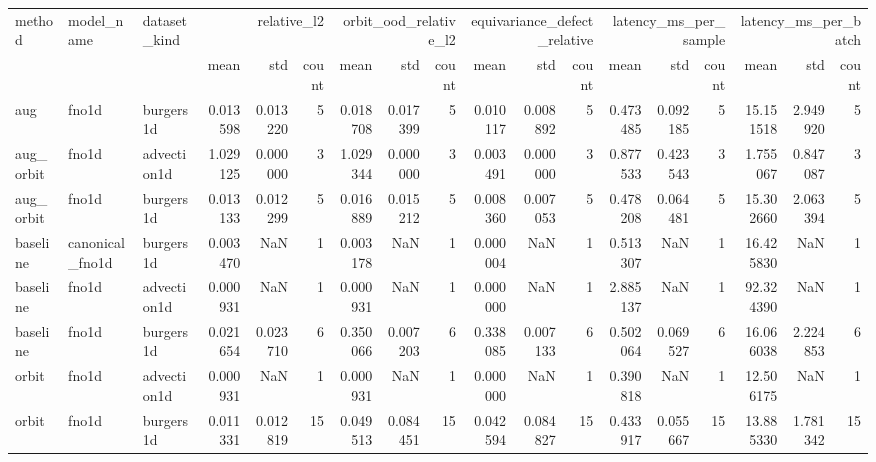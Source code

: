 \begin{tabular}{lllrrrrrrrrrrrrrrr}
\toprule
method & model_name & dataset_kind & \multicolumn{3}{r}{relative_l2} & \multicolumn{3}{r}{orbit_ood_relative_l2} & \multicolumn{3}{r}{equivariance_defect_relative} & \multicolumn{3}{r}{latency_ms_per_sample} & \multicolumn{3}{r}{latency_ms_per_batch} \\
 &  &  & mean & std & count & mean & std & count & mean & std & count & mean & std & count & mean & std & count \\
\midrule
aug & fno1d & burgers1d & 0.013598 & 0.013220 & 5 & 0.018708 & 0.017399 & 5 & 0.010117 & 0.008892 & 5 & 0.473485 & 0.092185 & 5 & 15.151518 & 2.949920 & 5 \\
aug_orbit & fno1d & advection1d & 1.029125 & 0.000000 & 3 & 1.029344 & 0.000000 & 3 & 0.003491 & 0.000000 & 3 & 0.877533 & 0.423543 & 3 & 1.755067 & 0.847087 & 3 \\
aug_orbit & fno1d & burgers1d & 0.013133 & 0.012299 & 5 & 0.016889 & 0.015212 & 5 & 0.008360 & 0.007053 & 5 & 0.478208 & 0.064481 & 5 & 15.302660 & 2.063394 & 5 \\
baseline & canonical_fno1d & burgers1d & 0.003470 & NaN & 1 & 0.003178 & NaN & 1 & 0.000004 & NaN & 1 & 0.513307 & NaN & 1 & 16.425830 & NaN & 1 \\
baseline & fno1d & advection1d & 0.000931 & NaN & 1 & 0.000931 & NaN & 1 & 0.000000 & NaN & 1 & 2.885137 & NaN & 1 & 92.324390 & NaN & 1 \\
baseline & fno1d & burgers1d & 0.021654 & 0.023710 & 6 & 0.350066 & 0.007203 & 6 & 0.338085 & 0.007133 & 6 & 0.502064 & 0.069527 & 6 & 16.066038 & 2.224853 & 6 \\
orbit & fno1d & advection1d & 0.000931 & NaN & 1 & 0.000931 & NaN & 1 & 0.000000 & NaN & 1 & 0.390818 & NaN & 1 & 12.506175 & NaN & 1 \\
orbit & fno1d & burgers1d & 0.011331 & 0.012819 & 15 & 0.049513 & 0.084451 & 15 & 0.042594 & 0.084827 & 15 & 0.433917 & 0.055667 & 15 & 13.885330 & 1.781342 & 15 \\
\bottomrule
\end{tabular}

